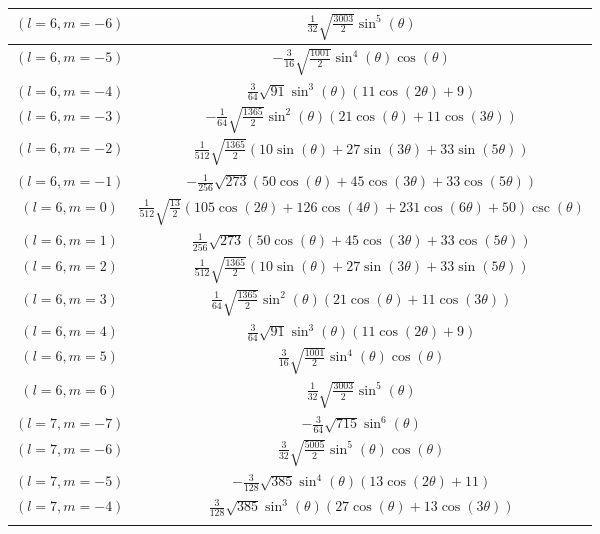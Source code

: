 \begin{center}
\begin{longtable}{|c|c|}
$(l=6, m=-6)$ & $\frac{1}{32} \sqrt{\frac{3003}{2}} \sin ^5(\theta )$ \\ \hline
\rowcolor{gray!15}
$(l=6, m=-5)$ & $-\frac{3}{16} \sqrt{\frac{1001}{2}} \sin ^4(\theta ) \cos (\theta )$ \\ \hline
$(l=6, m=-4)$ & $\frac{3}{64} \sqrt{91} \sin ^3(\theta ) (11 \cos (2 \theta )+9)$ \\ \hline
\rowcolor{gray!15}
$(l=6, m=-3)$ & $-\frac{1}{64} \sqrt{\frac{1365}{2}} \sin ^2(\theta ) (21 \cos (\theta )+11 \cos (3 \theta ))$ \\ \hline
$(l=6, m=-2)$ & $\frac{1}{512} \sqrt{\frac{1365}{2}} (10 \sin (\theta )+27 \sin (3 \theta )+33 \sin (5 \theta ))$ \\ \hline
\rowcolor{gray!15}
$(l=6, m=-1)$ & $-\frac{1}{256} \sqrt{273} (50 \cos (\theta )+45 \cos (3 \theta )+33 \cos (5 \theta ))$ \\ \hline
$(l=6, m=0)$ & $\frac{1}{512} \sqrt{\frac{13}{2}} (105 \cos (2 \theta )+126 \cos (4 \theta )+231 \cos (6 \theta )+50) \csc (\theta )$ \\ \hline
\rowcolor{gray!15}
$(l=6, m=1)$ & $\frac{1}{256} \sqrt{273} (50 \cos (\theta )+45 \cos (3 \theta )+33 \cos (5 \theta ))$ \\ \hline
$(l=6, m=2)$ & $\frac{1}{512} \sqrt{\frac{1365}{2}} (10 \sin (\theta )+27 \sin (3 \theta )+33 \sin (5 \theta ))$ \\ \hline
\rowcolor{gray!15}
$(l=6, m=3)$ & $\frac{1}{64} \sqrt{\frac{1365}{2}} \sin ^2(\theta ) (21 \cos (\theta )+11 \cos (3 \theta ))$ \\ \hline
$(l=6, m=4)$ & $\frac{3}{64} \sqrt{91} \sin ^3(\theta ) (11 \cos (2 \theta )+9)$ \\ \hline
\rowcolor{gray!15}
$(l=6, m=5)$ & $\frac{3}{16} \sqrt{\frac{1001}{2}} \sin ^4(\theta ) \cos (\theta )$ \\ \hline
$(l=6, m=6)$ & $\frac{1}{32} \sqrt{\frac{3003}{2}} \sin ^5(\theta )$ \\ \hline
\rowcolor{gray!15}
$(l=7, m=-7)$ & $-\frac{3}{64} \sqrt{715} \sin ^6(\theta )$ \\ \hline
$(l=7, m=-6)$ & $\frac{3}{32} \sqrt{\frac{5005}{2}} \sin ^5(\theta ) \cos (\theta )$ \\ \hline
\rowcolor{gray!15}
$(l=7, m=-5)$ & $-\frac{3}{128} \sqrt{385} \sin ^4(\theta ) (13 \cos (2 \theta )+11)$ \\ \hline
$(l=7, m=-4)$ & $\frac{3}{128} \sqrt{385} \sin ^3(\theta ) (27 \cos (\theta )+13 \cos (3 \theta ))$ \\ \hline
\rowcolor{gray!15}

\end{longtable}
\end{center}
